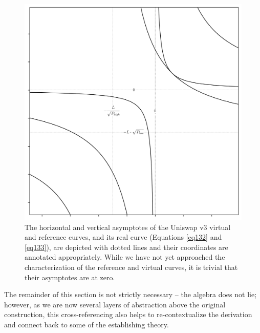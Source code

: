 \documentclass{article}
\begin{document}
\begin{figure}[ht]
    \centering
    \includegraphics[width=\textwidth]{fig26.png}
    \captionsetup{
        justification=raggedright,
        singlelinecheck=false,
        font=small,
        labelfont=bf,
        labelsep=quad,
        format=plain
    }
    \caption{The horizontal and vertical asymptotes of the Uniswap v3 virtual and reference curves, and its real curve (Equations \ref{eq132} and \ref{eq133}), are depicted with dotted lines and their coordinates are annotated appropriately. While we have not yet approached the characterization of the reference and virtual curves, it is trivial that their asymptotes are at zero.}
    \label{fig26}
\end{figure}

The remainder of this section is not strictly necessary – the algebra does not lie; however, as we are now several layers of abstraction above the original construction, this cross-referencing also helps to re-contextualize the derivation and connect back to some of the establishing theory. 
\end{document}
